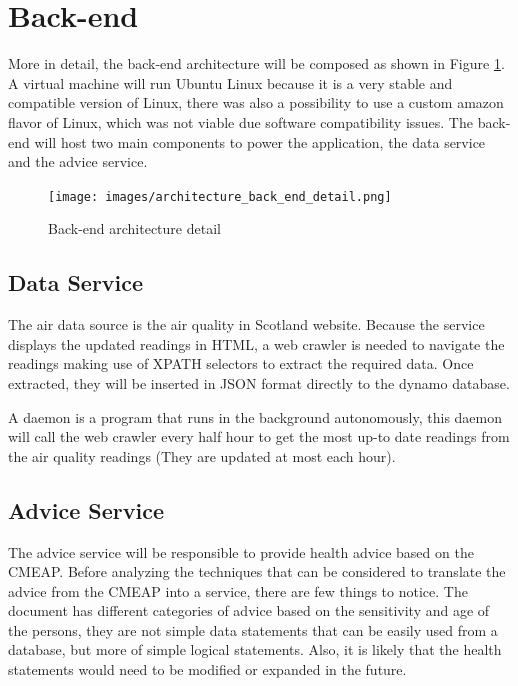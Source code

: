 \section{Back-end}
More in detail, the back-end architecture will be composed as shown in Figure \ref{fig:architecture_back_end_detail}. A virtual machine will run Ubuntu Linux because it is a very stable and compatible version of Linux, there was also a possibility to use a custom amazon flavor of Linux, which was not viable due software compatibility issues. The back-end will host two main components to power the application, the data service and the advice service. 

\begin{figure}[H]
\begin{adjustbox}{width=1\textwidth,center=\textwidth}
  \centering
  \texttt{[image: images/architecture\_back\_end\_detail.png]}
\end{adjustbox}
  \caption[Back-end architecture]{Back-end architecture detail}
  \label{fig:architecture_back_end_detail}
\end{figure}


\subsection{Data Service}

 The air data source is the air quality in Scotland website. Because the service displays the updated readings in HTML, a web crawler is needed to navigate the readings making use of XPATH selectors to extract the required data. Once extracted, they will be inserted in JSON format directly to the dynamo database.
 
A daemon is a program that runs in the background autonomously, this daemon will call the web crawler every half hour to get the most up-to date readings from the air quality readings (They are updated at most each hour). 

\subsection{Advice Service}
The advice service will be responsible to provide health advice based on the CMEAP\cite{HealthProtectionAgencyfortheCommitteeontheMedicalEffectsofAirPollutants2011}. Before analyzing the techniques that can be considered to translate the advice from the CMEAP into a service, there are few things to notice. The document has different categories of advice based on the sensitivity and age of the persons, they are not simple data statements that can be easily used from a database, but more of simple logical statements. Also, it is likely that the health statements would need to be modified or expanded in the future. 

